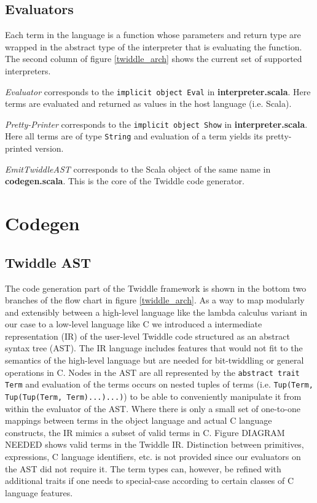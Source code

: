 \documentclass{article}
\begin{document}
\subsection{Evaluators}
Each term in the language is a function whose parameters and return type are wrapped in the abstract type of the interpreter that is evaluating the function. The second column of figure \ref{twiddle_arch} shows the current set of supported interpreters.

\textit{Evaluator} corresponds to the \texttt{implicit object Eval} in \textbf{interpreter.scala}. Here terms are evaluated and returned as values in the host language (i.e. Scala).

\textit{Pretty-Printer} corresponds to the \texttt{implicit object Show} in \textbf{interpreter.scala}. Here all terms are of type \texttt{String} and evaluation of a term yields its pretty-printed version.

\textit{EmitTwiddleAST} corresponds to the Scala object of the same name in \textbf{codegen.scala}. This is the core of the Twiddle code generator.

\section{Codegen}
\subsection{Twiddle AST}
The code generation part of the Twiddle framework is shown in the bottom two branches of the flow chart in figure \ref{twiddle_arch}. As a way to map modularly and extensibly between a high-level language like the lambda calculus variant in our case to a low-level language like C we introduced a intermediate representation (IR) of the user-level Twiddle code structured as an abstract syntax tree (AST). The IR language includes features that would not fit to the semantics of the high-level language but are needed for bit-twiddling or general operations in C. Nodes in the AST are all represented by the \texttt{abstract trait Term} and evaluation of the terms occurs on nested tuples of terms (i.e. \texttt{Tup(Term, Tup(Tup(Term, Term)...)...)}) to be able to conveniently manipulate it from within the evaluator of the AST. Where there is only a small set of one-to-one mappings between terms in the object language and actual C language constructs, the IR mimics a subset of valid terms in C. Figure DIAGRAM NEEDED shows valid terms in the Twiddle IR. Distinction between primitives, expressions, C language identifiers, etc. is not provided since our evaluators on the AST did not require it. The term types can, however, be refined with additional traits if one needs to special-case according to certain classes of C language features.
\end{document}
